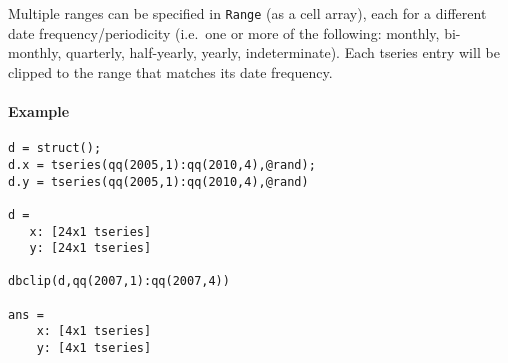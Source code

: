 Multiple ranges can be specified in \texttt{Range} (as a cell array),
each for a different date frequency/periodicity (i.e.~one or more of the
following: monthly, bi-monthly, quarterly, half-yearly, yearly,
indeterminate). Each tseries entry will be clipped to the range that
matches its date frequency.

\paragraph{Example}\label{example}

\begin{verbatim}
d = struct();
d.x = tseries(qq(2005,1):qq(2010,4),@rand);
d.y = tseries(qq(2005,1):qq(2010,4),@rand)

d =
   x: [24x1 tseries]
   y: [24x1 tseries]

dbclip(d,qq(2007,1):qq(2007,4))

ans =
    x: [4x1 tseries]
    y: [4x1 tseries]
\end{verbatim}


